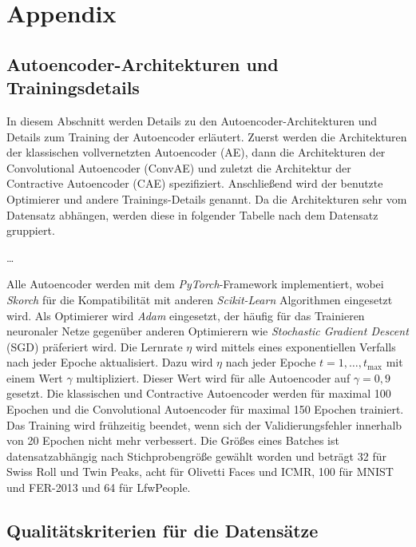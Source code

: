 
\chapter{Appendix}
\label{ch:Appendix}

\section{Autoencoder-Architekturen und Trainingsdetails}
\label{ch:Appendix:Architektur-Details}
In diesem Abschnitt werden Details zu den Autoencoder-Architekturen und Details zum Training der Autoencoder erläutert. Zuerst werden die Architekturen der klassischen vollvernetzten Autoencoder (AE), dann die Architekturen der Convolutional Autoencoder (ConvAE) und zuletzt die Architektur der Contractive Autoencoder (CAE) spezifiziert. Anschließend wird der benutzte Optimierer und andere Trainings-Details genannt. Da die Architekturen sehr vom Datensatz abhängen, werden diese in folgender Tabelle nach dem Datensatz gruppiert.

\ldots

Alle Autoencoder werden mit dem \textit{PyTorch}-Framework implementiert, wobei \textit{Skorch} für
die Kompatibilität mit anderen \textit{Scikit-Learn} Algorithmen eingesetzt wird. Als Optimierer
wird \textit{Adam} eingesetzt, der häufig für das Trainieren neuronaler Netze gegenüber anderen
Optimierern wie \textit{Stochastic Gradient Descent} (SGD) präferiert wird. Die Lernrate $\eta$
wird mittels eines exponentiellen Verfalls nach jeder Epoche aktualisiert. Dazu wird $\eta$ nach
jeder Epoche $t = 1, \ldots, t_{\text{max}}$ mit einem Wert $\gamma$ multipliziert. Dieser Wert
wird für alle Autoencoder auf $\gamma = 0,9$ gesetzt. Die klassischen und Contractive Autoencoder
werden für maximal 100 Epochen und die Convolutional Autoencoder für maximal 150 Epochen trainiert.
Das Training wird frühzeitig beendet, wenn sich der Validierungsfehler innerhalb von 20 Epochen
nicht mehr verbessert. Die Größes eines Batches ist datensatzabhängig nach Stichprobengröße gewählt
worden und beträgt 32 für Swiss Roll und Twin Peaks, acht für Olivetti Faces und ICMR, 100 für
MNIST und FER-2013 und 64 für LfwPeople.

\section{Qualitätskriterien für die Datensätze}
\label{ch:Appendix:Qualitaetskriterien}

